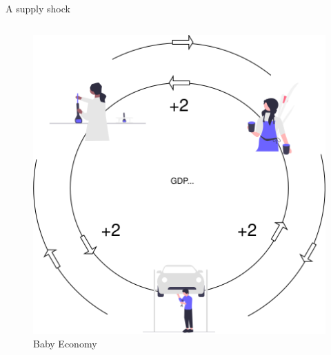 \begin{frame}{A supply shock}
\protect\hypertarget{a-supply-shock}{}
\begin{columns}[T]
\begin{column}{0.48\textwidth}
\begin{overprint}


\begin{figure}
\centering
\includegraphics[width=1\textwidth,height=\textheight]{assets/circular.png}
\caption{Baby Economy}
\end{figure}



\end{overprint}
\end{column}
\end{columns}
\end{frame}
